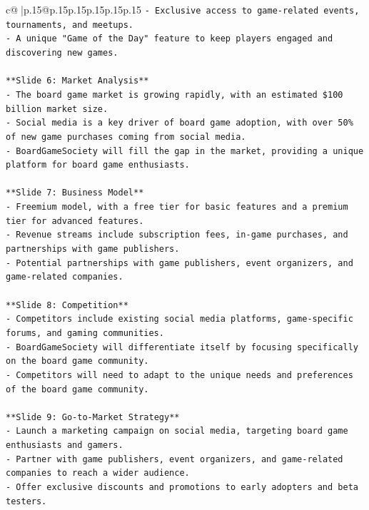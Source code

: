 \documentclass{article}
\begin{document}
{\begin{supertabular}{c@{$\;$}|p{.15\linewidth}@{}p{.15\linewidth}p{.15\linewidth}p{.15\linewidth}p{.15\linewidth}p{.15\linewidth}}
{{{\texttt{{-} Exclusive access to game{-}related events, tournaments, and meetups.} \\
\texttt{{-} A unique "Game of the Day" feature to keep players engaged and discovering new games.} \\
\\ 
\texttt{**Slide 6: Market Analysis**} \\
\texttt{{-} The board game market is growing rapidly, with an estimated \$100 billion market size.} \\
\texttt{{-} Social media is a key driver of board game adoption, with over 50\% of new game purchases coming from social media.} \\
\texttt{{-} BoardGameSociety will fill the gap in the market, providing a unique platform for board game enthusiasts.} \\
\\ 
\texttt{**Slide 7: Business Model**} \\
\texttt{{-} Freemium model, with a free tier for basic features and a premium tier for advanced features.} \\
\texttt{{-} Revenue streams include subscription fees, in{-}game purchases, and partnerships with game publishers.} \\
\texttt{{-} Potential partnerships with game publishers, event organizers, and game{-}related companies.} \\
\\ 
\texttt{**Slide 8: Competition**} \\
\texttt{{-} Competitors include existing social media platforms, game{-}specific forums, and gaming communities.} \\
\texttt{{-} BoardGameSociety will differentiate itself by focusing specifically on the board game community.} \\
\texttt{{-} Competitors will need to adapt to the unique needs and preferences of the board game community.} \\
\\ 
\texttt{**Slide 9: Go{-}to{-}Market Strategy**} \\
\texttt{{-} Launch a marketing campaign on social media, targeting board game enthusiasts and gamers.} \\
\texttt{{-} Partner with game publishers, event organizers, and game{-}related companies to reach a wider audience.} \\
\texttt{{-} Offer exclusive discounts and promotions to early adopters and beta testers.} \\
}}}
\end{supertabular}}
\end{document}
